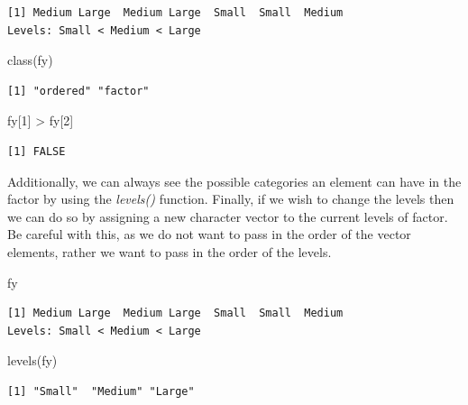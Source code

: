 \documentclass[
  letterpaper,
  DIV=11,
  numbers=noendperiod]{scrreprt}
\newenvironment{Shaded}{\begin{snugshade}}{\end{snugshade}}
\newcommand{\DecValTok}[1]{\textcolor[rgb]{0.68,0.00,0.00}{#1}}
\newcommand{\FunctionTok}[1]{\textcolor[rgb]{0.28,0.35,0.67}{#1}}
\newcommand{\NormalTok}[1]{\textcolor[rgb]{0.00,0.23,0.31}{#1}}
\newcommand{\SpecialCharTok}[1]{\textcolor[rgb]{0.37,0.37,0.37}{#1}}
\begin{document}
\begin{verbatim}
[1] Medium Large  Medium Large  Small  Small  Medium
Levels: Small < Medium < Large
\end{verbatim}

\begin{Shaded}
\begin{Highlighting}[]
\FunctionTok{class}\NormalTok{(fy)}
\end{Highlighting}
\end{Shaded}

\begin{verbatim}
[1] "ordered" "factor" 
\end{verbatim}

\begin{Shaded}
\begin{Highlighting}[]
\NormalTok{fy[}\DecValTok{1}\NormalTok{] }\SpecialCharTok{\textgreater{}}\NormalTok{ fy[}\DecValTok{2}\NormalTok{]}
\end{Highlighting}
\end{Shaded}

\begin{verbatim}
[1] FALSE
\end{verbatim}

Additionally, we can always see the possible categories an element can
have in the factor by using the \emph{levels()} function. Finally, if we
wish to change the levels then we can do so by assigning a new character
vector to the current levels of factor. Be careful with this, as we do
not want to pass in the order of the vector elements, rather we want to
pass in the order of the levels.

\begin{Shaded}
\begin{Highlighting}[]
\NormalTok{fy}
\end{Highlighting}
\end{Shaded}

\begin{verbatim}
[1] Medium Large  Medium Large  Small  Small  Medium
Levels: Small < Medium < Large
\end{verbatim}

\begin{Shaded}
\begin{Highlighting}[]
\FunctionTok{levels}\NormalTok{(fy)}
\end{Highlighting}
\end{Shaded}

\begin{verbatim}
[1] "Small"  "Medium" "Large" 
\end{verbatim}
\end{document}
